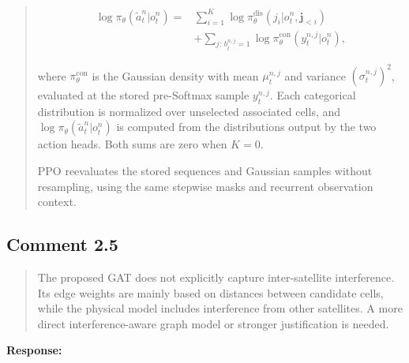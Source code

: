 \documentclass[11pt,a4paper]{article}
\begin{document}
\begin{quote}\small\color{revisionblue}
\begin{equation*}
\begin{aligned}
\log\pi_{\theta}(\widetilde a_t^n|o_t^n)
={}&\sum_{i=1}^{K}\log\pi_{\theta}^{\mathrm{dis}}(j_i|o_t^n,\mathbf j_{<i})\\
&+\sum_{j:\,b_t^{n,j}=1}\log\pi_{\theta}^{\mathrm{con}}(y_t^{n,j}|o_t^n),
\end{aligned}
\tag{62}\end{equation*}

where $\pi_{\theta}^{\mathrm{con}}$ is the Gaussian density with mean $\mu_t^{n,j}$ and variance $(\sigma_t^{n,j})^2$, evaluated at the stored pre-Softmax sample $y_t^{n,j}$. Each categorical distribution is normalized over unselected associated cells, and $\log\pi_{\theta}(\widetilde a_t^n|o_t^n)$ is computed from the distributions output by the two action heads. Both sums are zero when $K=0$.
\par

PPO reevaluates the stored sequences and Gaussian samples without resampling, using the same stepwise masks and recurrent observation context.
\par
\end{quote}


\subsection*{Comment 2.5}

\begin{quote}\small The proposed GAT does not explicitly capture inter-satellite interference. Its edge weights are mainly based on distances between candidate cells, while the physical model includes interference from other satellites. A more direct interference-aware graph model or stronger justification is needed.\end{quote}

\textbf{Response:}\par
\end{document}
